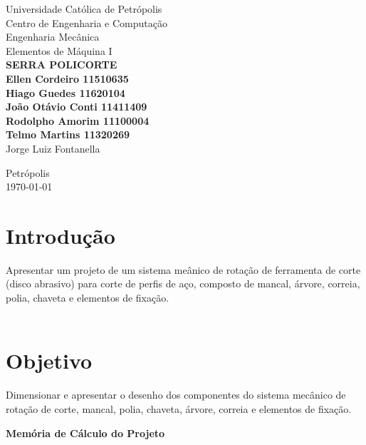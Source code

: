 \documentclass[11pt,a4paper]{report}
\begin{document}
\begin{titlepage} %
\begin{center} %
{\large Universidade Cat\'olica de Petr\'opolis}\\[0.1cm] %
{\large Centro de Engenharia e Computa\c{c}\~ao}\\[0.1cm] %
{\large Engenharia Mec\^anica}\\[0.1cm]
{\large Elementos de M\'aquina I}\\[5.1cm]
{\bf \huge SERRA POLICORTE}\\[3.1cm] %
{\bf \large Ellen Cordeiro 11510635\\
Hiago Guedes 11620104\\
Jo\~ao Ot\'avio Conti 11411409\\
Rodolpho Amorim 11100004\\
Telmo Martins 11320269}\\[2.9cm] %
{\large Jorge Luiz Fontanella }\\[2.9cm]
\end{center} %

\begin{center}
{\large Petr\'opolis}\\[0.2cm]
{\large \today}
\end{center}
\end{titlepage} %


\tableofcontents
\newpage
\chapter{Introdu\c{c}\~ao}
Apresentar um projeto de um sistema me\^anico de rota\c{c}\~ao de ferramenta
de corte (disco abrasivo) para corte de perfis de a\c{c}o, composto de mancal, \'arvore,
correia, polia, chaveta e elementos de fixa\c{c}\~ao.\\\\
\chapter{Objetivo}
Dimensionar e apresentar o desenho dos componentes do sistema
mec\^anico de rota\c{c}\~ao de corte, mancal, polia, chaveta, \'arvore, correia e elementos
de fixa\c{c}\~ao.\\
\begin{center}
\textbf{Mem\'oria de C\'alculo do Projeto}
\end{center}
\end{document}
